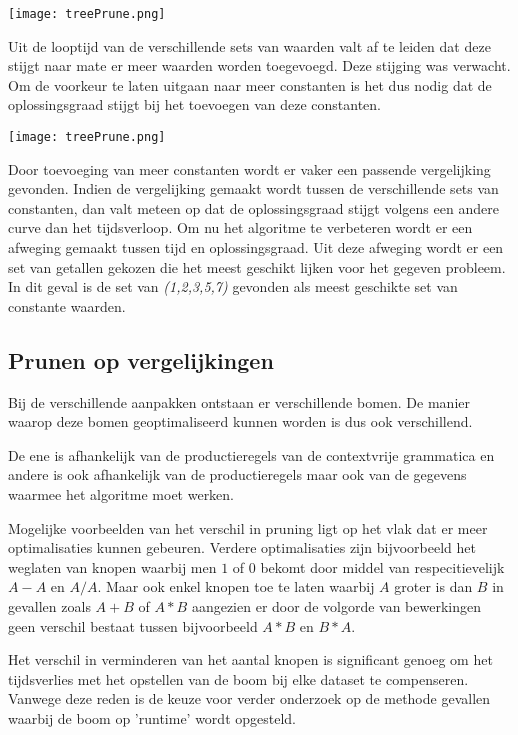 \documentclass[Main.tex]{subfiles}
\begin{document}
\begin{center}
\texttt{[image: treePrune.png]} %
\end{center}

Uit de looptijd van de verschillende sets van waarden valt af te leiden dat deze stijgt naar mate er meer waarden worden toegevoegd. Deze stijging was verwacht. Om de voorkeur te laten uitgaan naar meer constanten is het dus nodig dat de oplossingsgraad stijgt bij het toevoegen van deze constanten. 

\begin{center}
\texttt{[image: treePrune.png]} 
\end{center}

Door toevoeging van meer constanten wordt er vaker een passende vergelijking gevonden. Indien de vergelijking gemaakt wordt tussen de verschillende sets van constanten, dan valt meteen op dat de oplossingsgraad stijgt volgens een andere curve dan het tijdsverloop. Om nu het algoritme te verbeteren wordt er een afweging gemaakt tussen tijd en oplossingsgraad. Uit deze afweging wordt er een set van getallen gekozen die het meest geschikt lijken voor het gegeven probleem. In dit geval is de set van \textit{(1,2,3,5,7)} gevonden als meest geschikte set van constante waarden. 

\subsection{Prunen op vergelijkingen}
Bij de verschillende aanpakken ontstaan er verschillende bomen. De manier waarop deze bomen geoptimaliseerd kunnen worden is dus ook verschillend. 

De ene is afhankelijk van de productieregels van de contextvrije grammatica en andere is ook afhankelijk van de productieregels maar ook van de gegevens waarmee het algoritme moet werken. 
\par 
Mogelijke voorbeelden van het verschil in pruning ligt op het vlak dat er meer optimalisaties kunnen gebeuren. Verdere optimalisaties zijn bijvoorbeeld het weglaten van knopen waarbij men $1$ of $0$ bekomt door middel van respecitievelijk $A-A$ en $A/A$. Maar ook enkel knopen toe te laten waarbij $A$ groter is dan $B$ in gevallen zoals $A+B$ of $A \ast B$ aangezien er door de volgorde van bewerkingen geen verschil bestaat tussen bijvoorbeeld $A*B$ en $B \ast A$.
\par 

Het verschil in verminderen van het aantal knopen is significant genoeg om het tijdsverlies met het opstellen van de boom bij elke dataset te compenseren. Vanwege deze reden is de keuze voor verder onderzoek op de methode gevallen waarbij de boom op 'runtime' wordt opgesteld. 
\end{document}
